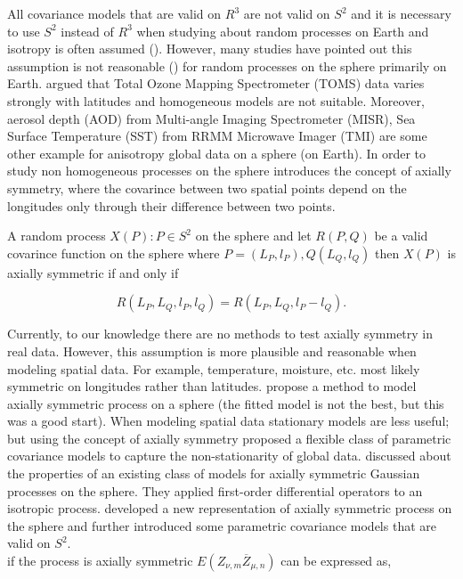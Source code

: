 		All covariance models that are valid on $R^3$ are not valid on $S^2$ and it is necessary to use $S^2$ instead of $R^3$ when studying about random processes on Earth and isotropy is often assumed (\cite{Yadrenko1983, Yaglom1987}). However, many studies have pointed out this assumption is not reasonable (\cite{Stein2007, JunStein2008, BolinLindgren2011}) for random processes on the sphere primarily on Earth. \cite{Stein2007} argued that Total Ozone Mapping Spectrometer (TOMS) data varies strongly with latitudes and homogeneous models are not suitable. Moreover, aerosol depth (AOD) from Multi-angle Imaging Spectrometer (MISR), Sea Surface Temperature (SST) from RRMM Microwave Imager (TMI) are some other example for anisotropy global data on a sphere (on Earth). In order to study non homogeneous processes on the sphere \cite{Jones1963} introduces the concept of axially symmetry, where the covarince between two spatial points depend on the longitudes only through their difference  between two points.
			
		A random process $X(P): P\in S^2$ on the sphere and let $R(P,Q)$ be a valid covarince function on the sphere where $P=(L_P, l_P), Q(L_Q,l_Q)$ then $X(P)$ is axially symmetric if and only if
		
		\[
			R(L_P, L_Q, l_P, l_Q) = R(L_P, L_Q, l_P-l_Q).
		\]
		
		Currently, to our knowledge there are no methods to test axially symmetry in real data. However, this assumption is more plausible and reasonable when modeling spatial data. For example, temperature, moisture, etc. most likely symmetric on longitudes rather than latitudes. \cite{Stein2007} propose a method to model axially symmetric process on a sphere (the fitted model is not the best, but this was a good start). When modeling spatial data stationary models are less useful; but using the concept of axially symmetry \cite{JunStein2008} proposed a flexible class of parametric covariance models to capture the non-stationarity of global data. \cite{HitczenkoStein2012} discussed about the properties of an existing class of models for axially symmetric Gaussian processes on the sphere. They applied first-order differential operators to an isotropic process. \cite{Huang2012} developed a new representation of axially symmetric process on the sphere and further introduced some parametric covariance models that are valid on $S^2$.  \\
		
		if the process is axially symmetric $E(Z_{\nu,m} \overline{Z}_{\mu,n})$ can be expressed as,
		
